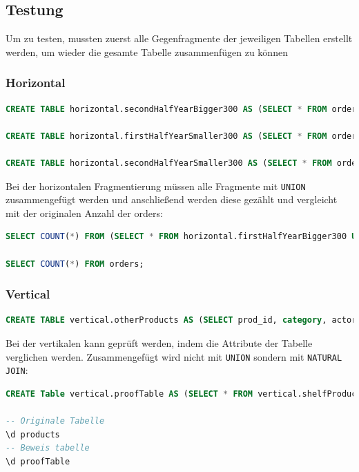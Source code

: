 \subsection{Testung}
Um zu testen, mussten zuerst alle Gegenfragmente der jeweiligen Tabellen erstellt werden, um wieder die gesamte Tabelle zusammenfügen zu können
\subsubsection{Horizontal}
\begin{lstlisting}[language=SQL]
CREATE TABLE horizontal.secondHalfYearBigger300 AS (SELECT * FROM orders WHERE netamount > 300 AND orderdate >= '2009-07-01');

CREATE TABLE horizontal.firstHalfYearSmaller300 AS (SELECT * FROM orders WHERE netamount <= 300 AND orderdate < '2009-07-01');

CREATE TABLE horizontal.secondHalfYearSmaller300 AS (SELECT * FROM orders WHERE netamount <= 300 AND orderdate >= '2009-07-01');
\end{lstlisting}

Bei der horizontalen Fragmentierung müssen alle Fragmente mit \verb|UNION| zusammengefügt werden und anschließend werden diese gezählt und vergleicht mit der originalen Anzahl der orders:

\begin{lstlisting}[language=SQL]
SELECT COUNT(*) FROM (SELECT * FROM horizontal.firstHalfYearBigger300 UNION SELECT * FROM horizontal.secondHalfYearBigger300 UNION SELECT * FROM horizontal.firstHalfYearSmaller300 UNION SELECT * FROM horizontal.secondHalfYearSmaller300) AS "sub";

SELECT COUNT(*) FROM orders;
\end{lstlisting}
\subsubsection{Vertical}
\begin{lstlisting}[language=SQL]
CREATE TABLE vertical.otherProducts AS (SELECT prod_id, category, actor, special, common_prod_id  FROM products);
\end{lstlisting}

Bei der vertikalen kann geprüft werden, indem die Attribute der Tabelle verglichen werden. Zusammengefügt wird nicht mit \verb|UNION| sondern mit \verb|NATURAL JOIN|:

\begin{lstlisting}[language=SQL]
CREATE Table vertical.proofTable AS (SELECT * FROM vertical.shelfProducts NATURAL JOIN vertical.otherProducts);

-- Originale Tabelle
\d products
-- Beweis tabelle
\d proofTable

\end{lstlisting}

